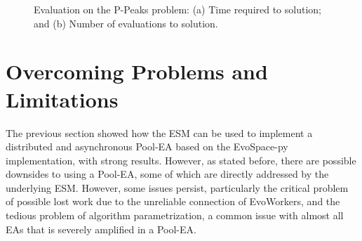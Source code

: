 \begin{figure}[t]
    \centering
    \caption{Evaluation on the P-Peaks problem:
    (a) Time required to solution; and
    (b) Number of evaluations to solution.}
    \label{fig:effort_real_time}
\end{figure}




\section{Overcoming Problems and Limitations}
\label{sec:overcome}
The previous section showed how the ESM can be used to implement a distributed and asynchronous Pool-EA based on the EvoSpace-py implementation,
with strong results.
However, as stated before, there are possible downsides to using a Pool-EA, some of which are directly addressed by the underlying ESM.
However, some issues persist, particularly the critical problem of possible lost work due to the unreliable connection of EvoWorkers,
and the tedious problem of algorithm parametrization, a common issue with almost all EAs that is severely amplified in a Pool-EA.


